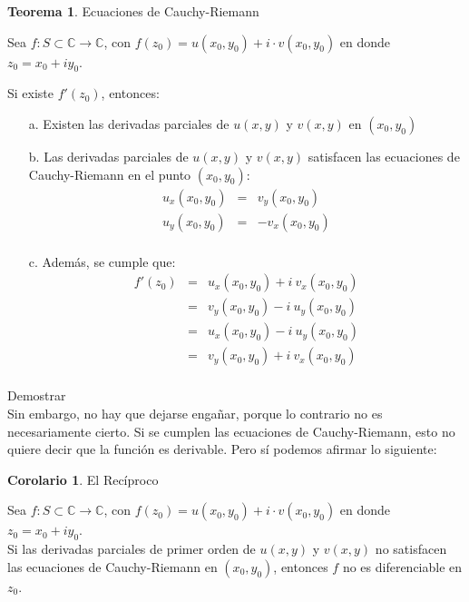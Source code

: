 \documentclass[12pt]{article}
\theoremstyle{definition}
\theoremstyle{theorem}
\newtheorem{theorem}{Teorema}[section]
\theoremstyle{corolary}
\newtheorem{corolary}{Corolario}[section]
\begin{document}
\colorbox{orange!40!white!80}{\parbox{\linewidth}{
\theoremstyle{theorem}
\begin{theorem} Ecuaciones de Cauchy-Riemann

Sea $f: S \subset \mathbb{C} \rightarrow \mathbb{C}$, con $f(z_0) = u(x_0, y_0) + i\cdot v(x_0, y_0)$ en donde $z_0 = x_0+iy_0$.

Si existe $f'(z_0)$, entonces:
\begin{enumerate}
	\item [a.] Existen las derivadas parciales de $u(x, y)$ y $v(x, y)$ en $(x_0, y_0)$
	\item [b.] Las derivadas parciales de $u(x, y)$ y $v(x, y)$ satisfacen las ecuaciones de Cauchy-Riemann en el punto $(x_0, y_0)$:
	\begin{eqnarray*}
	u_x(x_0, y_0) &=& v_y(x_0, y_0)\\
	u_y(x_0, y_0) &=& -v_x(x_0, y_0)\\  
	\end{eqnarray*}
	\item [c.] Adem\'as, se cumple que:
	\begin{eqnarray*}
	f'(z_0) &=& u_x(x_0, y_0) + i\ v_x(x_0, y_0)\\
	&=& v_y(x_0, y_0) - i\ u_y(x_0, y_0)\\
	&=& u_x(x_0, y_0) - i\ u_y(x_0, y_0)\\
	&=& v_y(x_0, y_0) + i\ v_x(x_0, y_0)\\
	\end{eqnarray*}
\end{enumerate}
 
\end{theorem}}}
\linebreak

Demostrar\\

Sin embargo, no hay que dejarse enga\~nar, porque lo contrario no es necesariamente cierto. Si se cumplen las ecuaciones de Cauchy-Riemann, esto no quiere decir que la funci\'on es derivable. Pero s\'i podemos afirmar lo siguiente:\\

\colorbox{orange!40!white!80}{\parbox{\linewidth}{
\theoremstyle{theorem}
\begin{corolary} {El Rec\'iproco}

Sea $f: S \subset \mathbb{C} \rightarrow \mathbb{C}$, con $f(z_0) = u(x_0, y_0) + i\cdot v(x_0, y_0)$ en donde $z_0 = x_0+iy_0$.\\

Si las derivadas parciales de primer orden de $u(x, y)$ y $v(x, y)$ no satisfacen las ecuaciones de Cauchy-Riemann en $(x_0, y_0)$, entonces $f$ no es diferenciable en $z_0$.
\end{corolary}}}
\linebreak
\end{document}
